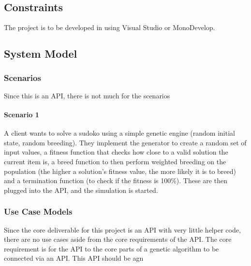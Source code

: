 \subsection{Constraints}
The project is to be developed in \csharp using Visual Studio or MonoDevelop.

\subsection{System Model}

\subsubsection{Scenarios}
Since this is an API, there is not much for the scenarios
\paragraph{Scenario 1}
A client wants to solve a sudoko using a simple genetic engine (random initial state, random breeding). They implement the generator to create a random set of input values, a fitness function that checks how close to a valid solution the current item is, a breed function to then perform weighted breeding on the population (the higher a solution's fitness value, the more likely it is to breed) and a termination function (to check if the fitness is 100\%).
These are then plugged into the API, and the simulation is started.

\subsubsection{Use Case Models}
% 
Since the core deliverable for this project is an API with very little helper code, there are no use cases aside from the core requirements of the API.
The core requirement is for the API to the core parts of a genetic algorithm to be connected via an API. This API should be agn
